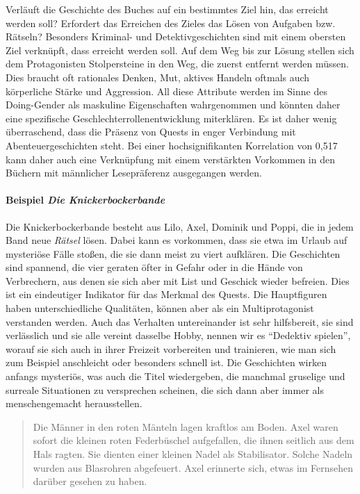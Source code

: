 Verläuft die Geschichte des Buches auf ein bestimmtes Ziel hin, das
erreicht werden soll? Erfordert das Erreichen des Zieles das Lösen von
Aufgaben bzw. Rätseln? Besonders Kriminal- und Detektivgeschichten sind
mit einem obersten Ziel verknüpft, dass erreicht werden soll. Auf dem
Weg bis zur Lösung stellen sich dem Protagonisten Stolpersteine in den
Weg, die zuerst entfernt werden müssen. Dies braucht oft rationales
Denken, Mut, aktives Handeln oftmals auch körperliche Stärke und
Aggression. All diese Attribute werden im Sinne des Doing-Gender als
maskuline Eigenschaften wahrgenommen und könnten daher eine spezifische
Geschlechterrollenentwicklung miterklären. Es ist daher wenig
überraschend, dass die Präsenz von Quests in enger Verbindung mit
Abenteuergeschichten steht. Bei einer hochsignifikanten Korrelation von
0,517 kann daher auch eine Verknüpfung mit einem verstärkten Vorkommen
in den Büchern mit männlicher Lesepräferenz ausgegangen werden.

\paragraph{Beispiel \emph{Die Knickerbockerbande}}

Die Knickerbockerbande besteht aus Lilo, Axel, Dominik und Poppi, die in
jedem Band neue \emph{Rätsel} lösen. Dabei kann es vorkommen, dass sie
etwa im Urlaub auf mysteriöse Fälle stoßen, die sie dann meist zu viert
aufklären. Die Geschichten sind spannend, die vier geraten öfter in
Gefahr oder in die Hände von Verbrechern, aus denen sie sich aber mit
List und Geschick wieder befreien. Dies ist ein eindeutiger Indikator
für das Merkmal des Quests. Die Hauptfiguren haben unterschiedliche
Qualitäten, können aber als ein Multiprotagonist verstanden werden. Auch
das Verhalten untereinander ist sehr hilfsbereit, sie sind verlässlich
und sie alle vereint dasselbe Hobby, nennen wir es ``Dedektiv spielen'',
worauf sie sich auch in ihrer Freizeit vorbereiten und trainieren, wie
man sich zum Beispiel anschleicht oder besonders schnell ist. Die
Geschichten wirken anfangs mysteriös, was auch die Titel wiedergeben,
die manchmal gruselige und surreale Situationen zu versprechen scheinen,
die sich dann aber immer als menschengemacht herausstellen.

\begin{quote}
Die Männer in den roten Mänteln lagen kraftlos am Boden. \textelp{} Axel
waren sofort die kleinen roten Federbüschel aufgefallen, die ihnen
seitlich aus dem Hals ragten. Sie dienten einer kleinen Nadel als
Stabilisator. Solche Nadeln wurden aus Blasrohren abgefeuert. Axel
erinnerte sich, etwas im Fernsehen darüber gesehen zu haben.
\parencite[][117]{Brezina2010}
\end{quote}

